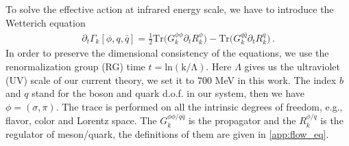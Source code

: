 \documentclass[aps,twocolumn,prd,superscriptaddress,nofootinbib,floatfix]{revtex4-2}
\begin{document}
To solve the effective action at infrared energy scale, we have to introduce the Wetterich equation \cite{Wetterich:1992yh}
%
\begin{align}\label{eq:wetterich_eq}
\partial_t\Gamma_k[\phi,q,\bar q]=\frac{1}{2}\mathrm{Tr}\bigg(G^{\phi\phi}_{k}\partial_t R^\phi_{k}\bigg)-\mathrm{Tr}\bigg(G^{q\bar q}_{k}\partial_t R^q_{k}\bigg)\,.
\end{align}
%
In order to preserve the dimensional consistency of the equations, we use the renormalization group (RG) time $t=\mathrm{ln(k/\Lambda)}$. Here $\Lambda$ gives us the ultraviolet (UV) scale of our current theory, we set it to 700 MeV in this work. The index $b$ and $q$ stand for the boson and quark d.o.f. in our system, then we have $\phi=(\sigma, \pi)$. The trace is performed on all the intrinsic degrees of freedom, e.g., flavor, color and Lorentz space. The $G^{\phi\phi/q\bar{q}}_k$ is the propagator and the $R^{\phi/q}_k$ is the regulator of meson/quark, the definitions of them are given in \cref{app:flow_eq}.
\end{document}
